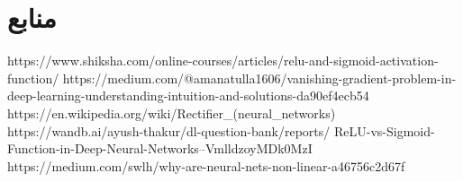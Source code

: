 \documentclass{article}
\begin{document}







\section*{منابع}
\renewcommand{\section}[2]{}%
\begin{thebibliography}{99} %


\begin{LTRitems}

\resetlatinfont

 https://www.shiksha.com/online-courses/articles/relu-and-sigmoid-activation-function/
 https://medium.com/@amanatulla1606/vanishing-gradient-problem-in-deep-learning-understanding-intuition-and-solutions-da90ef4ecb54
 https://en.wikipedia.org/wiki/Rectifier\_(neural\_networks)
 https://wandb.ai/ayush-thakur/dl-question-bank/reports/ ReLU-vs-Sigmoid-Function-in-Deep-Neural-Networks--VmlldzoyMDk0MzI
https://medium.com/swlh/why-are-neural-nets-non-linear-a46756c2d67f
\end{LTRitems}

\end{thebibliography}
\end{document}
